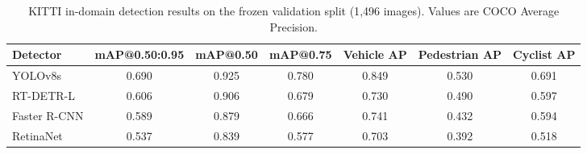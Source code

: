 \begin{table}[t]
    \centering
    \caption{KITTI in-domain detection results on the frozen validation split (1{,}496 images). Values are COCO Average Precision.}
    \label{tab:kitti_results}
    \begin{tabular}{lcccccc}
        \toprule
        Detector & mAP@0.50:0.95 & mAP@0.50 & mAP@0.75 & Vehicle AP & Pedestrian AP & Cyclist AP \\
        \midrule
        YOLOv8s & 0.690 & 0.925 & 0.780 & 0.849 & 0.530 & 0.691 \\
        RT-DETR-L & 0.606 & 0.906 & 0.679 & 0.730 & 0.490 & 0.597 \\
        Faster R-CNN & 0.589 & 0.879 & 0.666 & 0.741 & 0.432 & 0.594 \\
        RetinaNet & 0.537 & 0.839 & 0.577 & 0.703 & 0.392 & 0.518 \\
        \bottomrule
    \end{tabular}
\end{table}
